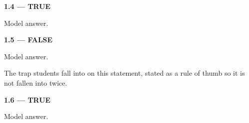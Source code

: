 \textbf{1.4 --- TRUE}
\begin{ans}
Model answer.
\end{ans}

\textbf{1.5 --- FALSE}
\begin{ans}
Model answer.
\end{ans}

\begin{caution}
The trap students fall into on this statement, stated as a rule of thumb
so it is not fallen into twice.
\end{caution}

\textbf{1.6 --- TRUE}
\begin{ans}
Model answer.
\end{ans}
